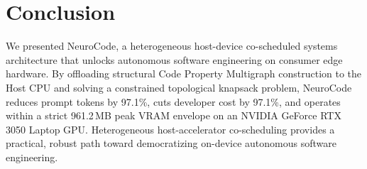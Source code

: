 \FloatBarrier
\section{Conclusion}
\label{sec:conclusion}

We presented NeuroCode, a heterogeneous host-device co-scheduled systems architecture that unlocks autonomous software engineering on consumer edge hardware. By offloading structural Code Property Multigraph construction to the Host CPU and solving a constrained topological knapsack problem, NeuroCode reduces prompt tokens by 97.1\%, cuts developer cost by 97.1\%, and operates within a strict 961.2\,MB peak VRAM envelope on an NVIDIA GeForce RTX 3050 Laptop GPU. Heterogeneous host-accelerator co-scheduling provides a practical, robust path toward democratizing on-device autonomous software engineering.
